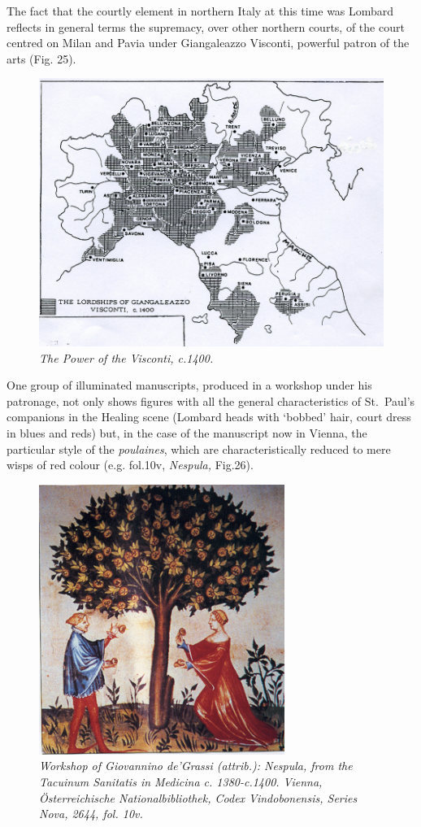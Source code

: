 \documentclass[a4paper,12pt]{article}
\begin{document}
The fact that the courtly element in northern Italy at this time was
Lombard reflects in general terms the supremacy, over other northern
courts, of the court centred on Milan and Pavia under Giangaleazzo
Visconti, powerful patron of the arts (Fig. 25). 
\begin{figure}[htbp]
\centering
\includegraphics[width=15cm]{pics/fig25.png}
\caption[The Power of the Visconti, c.1400.] 
{\it The Power of the Visconti, c.1400.}
\end{figure}
One group of
illuminated manuscripts, produced in a workshop under his patronage,
not only shows figures with all the general characteristics of
St.~Paul's companions in the Healing scene (Lombard heads with
`bobbed' hair, court dress in blues and reds) but, in the case of the
manuscript now in Vienna, the particular style of the
\textit{poulaines}, which are characteristically reduced to mere wisps
of red colour (e.g. fol.10v, \textit{Nespula,} Fig.26). 
\begin{figure}[htbp]
\centering
\includegraphics[width=8cm]{pics/fig26.png}
\caption[Workshop of Giovannino de'Grassi (attrib.): Nespula, from the
\textit{Tacuinum Sanitatis in Medicina} c. 1380-c.1400] 
{\it Workshop of Giovannino de'Grassi (attrib.): Nespula, from the
\textit{Tacuinum Sanitatis in Medicina} c. 1380-c.1400.
Vienna, \"Osterreichische Nationalbibliothek, Codex Vindobonensis,
Series Nova, 2644, fol. 10v.}
\end{figure}
\end{document}
